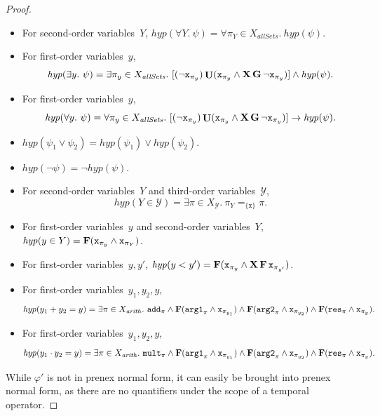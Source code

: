 \documentclass[dvipsnames,10pt,a4paper]{amsart}
\theoremstyle{definition}
\theoremstyle{remark}
\renewcommand{\phi}{\varphi}
\newcommand{\set}[1]{\{#1\}}
\newcommand{\F}{\mathop{\mathbf{F}\vphantom{a}}\nolimits}
\newcommand{\G}{\mathop{\mathbf{G}\vphantom{a}}\nolimits}
\DeclareMathOperator{\U}{\mathbf{U}}
\newcommand{\X}{\mathop{\mathbf{X}\vphantom{a}}\nolimits}
\newcommand{\inprop}{\mathtt{x}}
\newcommand{\argone}{\texttt{arg1}}
\newcommand{\argtwo}{\texttt{arg2}}
\newcommand{\res}{\texttt{res}}
\newcommand{\add}{\texttt{add}}
\newcommand{\mult}{\texttt{mult}}
\newcommand{\hyperize}{{\mathit{hyp}}}
\newcommand{\allsets}{{\mathit{allSets}}}
\newcommand{\arith}{\mathit{arith}}
\newcommand{\calY}{\mathcal{Y}}
\newcommand{\equals}[3]{#1 =_{#3} #2}
\begin{document}
\begin{proof}
\begin{itemize}
    \item For second-order variables~$Y$, $\hyperize(\forall Y.\ \psi) = \forall \pi_Y \in X_\allsets.\ \hyperize(\psi)$.
    
    \item For first-order variables~$y$, \[\hyperize(\exists y.\ \psi) = \exists \pi_y \in X_\allsets.\  [(\neg \inprop_{\pi_y}) \U (\inprop_{\pi_y}\wedge \X\G\neg\inprop_{\pi_y})] \wedge \hyperize(\psi).\]
    
    \item For first-order variables~$y$, \[\hyperize(\forall y.\ \psi) = \forall \pi_y \in X_\allsets.\ [(\neg \inprop_{\pi_y}) \U (\inprop_{\pi_y}\wedge \X\G\neg\inprop_{\pi_y})] \rightarrow \hyperize(\psi).\]
    
    \item $\hyperize(\psi_1 \vee \psi_2) = \hyperize(\psi_1) \vee \hyperize(\psi_2)$.
    
    \item $\hyperize(\neg \psi) = \neg \hyperize(\psi)$.

    \item For second-order variables~$Y$ and third-order variables~$\calY$, \[\hyperize(Y \in \calY) = \exists \pi \in X_{\calY}.\ \equals{\pi_Y}{\pi}{\set{\inprop}}.\]

    \item For first-order variables~$y$ and second-order variables~$Y$, $\hyperize(y \in Y) = \F(\inprop_{\pi_y} \wedge \inprop_{\pi_{Y}})$.
    
    \item For first-order variables~$y,y'$, $\hyperize(y < y') = \F(\inprop_{\pi_y} \wedge \X\F\inprop_{\pi_{y'}})$.
    
    \item For first-order variables~$y_1,y_2, y$, \[\hyperize(y_1 + y_2 = y) = \exists \pi \in X_\arith.\ \add_{\pi} \wedge 
    \F(\argone_{\pi} \wedge \inprop_{\pi_{y_1}}) \wedge 
    \F(\argtwo_{\pi} \wedge \inprop_{\pi_{y_2}}) \wedge
    \F(\res_{\pi} \wedge \inprop_{\pi_y}).\]

    \item For first-order variables~$y_1,y_2, y$, \[\hyperize(y_1 \cdot y_2 = y) = \exists \pi \in X_\arith.\ \mult_{\pi} \wedge 
    \F(\argone_{\pi} \wedge \inprop_{\pi_{y_1}}) \wedge 
    \F(\argtwo_{\pi} \wedge \inprop_{\pi_{y_2}}) \wedge
    \F(\res_{\pi} \wedge \inprop_{\pi_y}).\]

\end{itemize}
While $\phi'$ is not in prenex normal form, it can easily be brought into prenex normal form, as there are no quantifiers under the scope of a temporal operator.


\end{proof}
\end{document}
